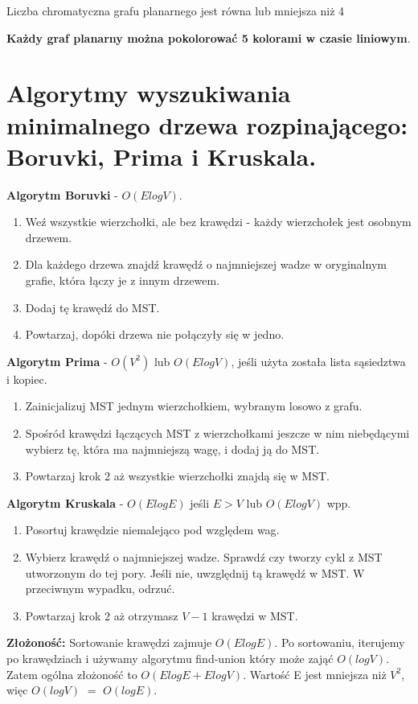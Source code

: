 \documentclass[main.tex]{subfiles}
\begin{document}
    \begin{theorem}
        Liczba chromatyczna grafu planarnego jest równa lub mniejsza niż 4
    \end{theorem}

    \textbf{Każdy graf planarny można pokolorować 5 kolorami w czasie liniowym}.



    \section{Algorytmy wyszukiwania minimalnego drzewa rozpinającego: Boruvki, Prima i Kruskala.}

    \textbf{Algorytm Boruvki} - $O(ElogV)$.
    \begin{enumerate}[noitemsep]
        \item Weź wszystkie wierzchołki, ale bez krawędzi - każdy wierzchołek jest osobnym drzewem.
        \item Dla każdego drzewa znajdź krawędź o najmniejszej wadze w oryginalnym grafie, która łączy je z innym drzewem.
        \item Dodaj tę krawędź do MST.
        \item Powtarzaj, dopóki drzewa nie połączyły się w jedno.
    \end{enumerate}

    \noindent \textbf{Algorytm Prima} - $O(V^2)$ lub $O(ElogV)$, jeśli użyta została lista sąsiedztwa i kopiec.
    \begin{enumerate}[noitemsep]
        \item Zainicjalizuj MST jednym wierzchołkiem, wybranym losowo z grafu.
        \item Spośród krawędzi łączących MST z wierzchołkami jeszcze w nim niebędącymi wybierz tę, która ma najmniejszą wagę, i dodaj ją do MST.
        \item Powtarzaj krok 2 aż wszystkie wierzchołki znajdą się w MST.
    \end{enumerate}

    \noindent \textbf{Algorytm Kruskala} -  $O(ElogE)$ jeśli $E > V$ lub $O(ElogV)$ wpp.
    \begin{enumerate}[noitemsep]
        \item Posortuj krawędzie niemalejąco pod względem wag.
        \item Wybierz krawędź o najmniejszej wadze. Sprawdź czy tworzy cykl z MST utworzonym do tej pory. Jeśli nie, uwzględnij tą krawędź w MST. W przeciwnym wypadku, odrzuć.
        \item Powtarzaj krok 2 aż otrzymasz $V-1$ krawędzi w MST.
    \end{enumerate}
    \textbf{Złożoność:} Sortowanie krawędzi zajmuje $O(ElogE)$. Po sortowaniu, iterujemy po krawędziach i używamy
    algorytmu find-union który może zająć $O(logV)$. Zatem ogólna złożoność to $O(ElogE+ElogV)$. Wartość E jest
    mniejsza niż $V^2$, więc $O(logV)$ $=$ $O(logE)$.
\end{document}
